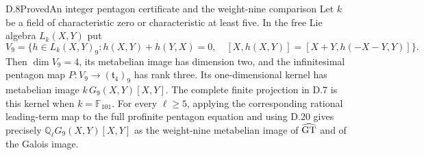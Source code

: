 \begin{statement}{D.8}{Proved}{An integer pentagon certificate and the weight-nine comparison}
Let $k$ be a field of characteristic zero or characteristic at
least five. In the free Lie algebra $L_k(X,Y)$ put
\[
 V_9=\{h\in L_k(X,Y)_9:
 h(X,Y)+h(Y,X)=0,\quad
 [X,h(X,Y)]=[X+Y,h(-X-Y,Y)]\}.
\]
Then $\dim V_9=4$, its metabelian image has dimension two,
and the infinitesimal pentagon map $P:V_9\to(\mathfrak t_4)_9$
has rank three. Its one-dimensional kernel has metabelian image
$k\,G_9(X,Y)[X,Y]$. The complete finite projection in D.7 is this kernel
when $k=\mathbb F_{101}$.
For every $\ell\ge5$, applying the corresponding rational
leading-term map to the full profinite pentagon equation and
using D.20 gives precisely $\mathbb Q_\ell G_9(X,Y)[X,Y]$ as the
weight-nine metabelian image of $\widehat{\rm GT}$ and of
the Galois image.
\end{statement}
